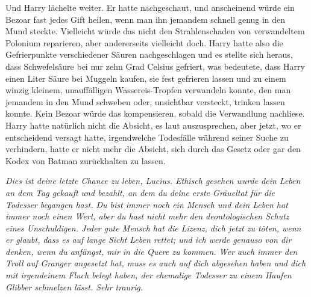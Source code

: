 Und Harry lächelte weiter.
Er hatte nachgeschaut, und anscheinend würde ein Bezoar fast jedes Gift heilen, wenn man ihn jemandem schnell genug in den Mund steckte. Vielleicht würde das nicht den Strahlenschaden von verwandeltem Polonium reparieren, aber andererseits vielleicht doch. Harry hatte also die Gefrierpunkte verschiedener Säuren nachgeschlagen und es stellte sich heraus, dass Schwefelsäure bei nur zehn Grad Celsius gefriert, was bedeutete, dass Harry einen Liter Säure bei Muggeln kaufen, sie fest gefrieren lassen und zu einem winzig kleinem, unauffälligen Wassereis-Tropfen verwandeln konnte, den man jemandem in den Mund schweben oder, unsichtbar versteckt, trinken lassen konnte. Kein Bezoar würde das kompensieren, sobald die Verwandlung nachliese.
Harry hatte natürlich nicht die Absicht, es laut auszusprechen, aber jetzt, wo er entscheidend versagt hatte, irgendwelche Todesfälle während seiner Suche zu verhindern, hatte er nicht mehr die Absicht, sich durch das Gesetz oder gar den Kodex von Batman zurückhalten zu lassen.

\emph{Dies ist deine letzte Chance zu leben, Lucius. Ethisch gesehen wurde dein Leben an dem Tag gekauft und bezahlt, an dem du deine erste Gräueltat für die Todesser begangen hast. Du bist immer noch ein Mensch und dein Leben hat immer noch einen Wert, aber du hast nicht mehr den deontologischen Schutz eines Unschuldigen. Jeder gute Mensch hat die Lizenz, dich jetzt zu töten, wenn er glaubt, dass es auf lange Sicht Leben rettet; und ich werde genauso von dir denken, wenn du anfängst, mir in die Quere zu kommen. Wer auch immer den Troll auf Granger angesetzt hat, muss es auch auf dich abgesehen haben und dich mit irgendeinem Fluch belegt haben, der ehemalige Todesser zu einem Haufen Glibber schmelzen lässt. Sehr traurig.}

